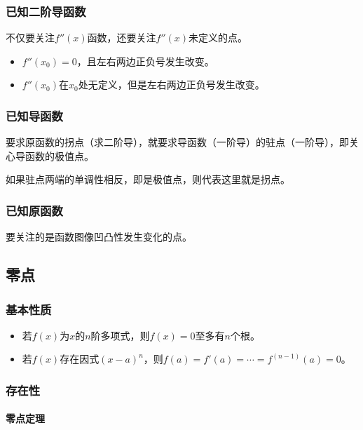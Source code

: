 \documentclass[UTF8, 12pt]{ctexart}
\begin{document}
\subsubsection{已知二阶导函数}

不仅要关注$f''(x)$函数，还要关注$f''(x)$未定义的点。

\begin{itemize}
    \item $f''(x_0)=0$，且左右两边正负号发生改变。
    \item $f''(x_0)$在$x_0$处无定义，但是左右两边正负号发生改变。
\end{itemize}

\subsubsection{已知导函数}

要求原函数的拐点（求二阶导），就要求导函数（一阶导）的驻点（一阶导），即关心导函数的极值点。

如果驻点两端的单调性相反，即是极值点，则代表这里就是拐点。

\subsubsection{已知原函数}

要关注的是函数图像凹凸性发生变化的点。

\subsection{零点}

\subsubsection{基本性质}

\begin{itemize}
    \item 若$f(x)$为$x$的$n$阶多项式，则$f(x)=0$至多有$n$个根。
    \item 若$f(x)$存在因式$(x-a)^n$，则$f(a)=f'(a)=\cdots=f^{(n-1)}(a)=0$。
\end{itemize}

\subsubsection{存在性}

\paragraph{零点定理} \leavevmode \medskip
\end{document}
